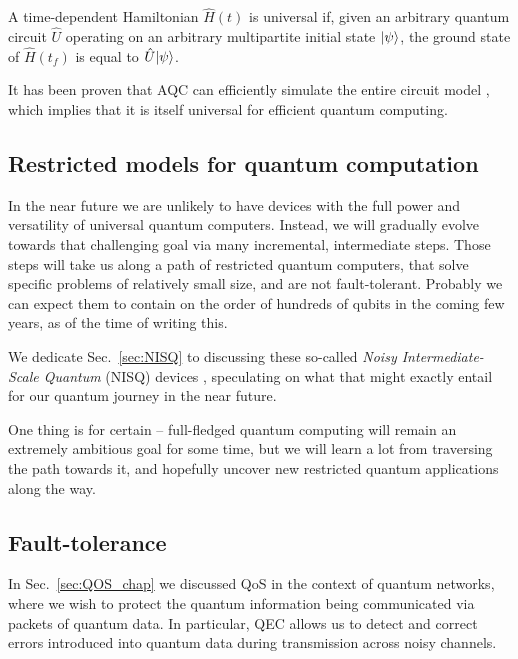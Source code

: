 A time-dependent Hamiltonian $\hat{H}(t)$ is universal if, given an arbitrary quantum circuit $\hat{U}$ operating on an arbitrary multipartite initial state $|\psi\rangle$, the ground state of $\hat{H}(t_f)$ is equal to $\hat{U}|\psi\rangle$.

It has been proven that AQC can efficiently simulate the entire circuit model \cite{bib:RevModPhys.90.015002}, which implies that it is itself universal for efficient quantum computing.

%
%

\subsection{Restricted models for quantum computation} \label{sec:restricted_models} 

In the near future we are unlikely to have devices with the full power and versatility of universal quantum computers. Instead, we will gradually evolve towards that challenging goal via many incremental, intermediate steps. Those steps will take us along a path of restricted quantum computers, that solve specific problems of relatively small size, and are not fault-tolerant. Probably we can expect them to contain on the order of hundreds of qubits in the coming few years, as of the time of writing this.

We dedicate Sec.~\ref{sec:NISQ} to discussing these so-called \textit{Noisy Intermediate-Scale Quantum} (NISQ) devices \cite{bib:preskill2018quantum}, speculating on what that might exactly entail for our quantum journey in the near future.

One thing is for certain -- full-fledged quantum computing will remain an extremely ambitious goal for some time, but we will learn a lot from traversing the path towards it, and hopefully uncover new restricted quantum applications along the way.

%
%

\subsection{Fault-tolerance}\label{sec:fault_tolerance}


In Sec.~\ref{sec:QOS_chap} we discussed QoS in the context of quantum networks, where we wish to protect the quantum information being communicated via packets of quantum data. In particular, QEC allows us to detect and correct errors introduced into quantum data during transmission across noisy channels.

